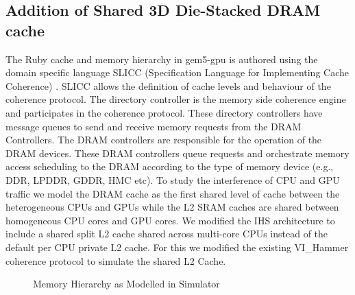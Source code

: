 \subsection{Addition of Shared 3D Die-Stacked DRAM cache}
The Ruby cache and memory hierarchy in gem5-gpu is authored using the domain specific language SLICC (Specification Language for Implementing Cache Coherence) \cite{gems}. SLICC allows the definition of cache levels and behaviour of the coherence protocol. The directory controller is the memory side coherence engine and participates in the coherence protocol. These directory controllers have message queues to send and receive memory requests from the DRAM Controllers. The DRAM controllers are responsible for the operation of the DRAM devices. These DRAM controllers queue requests and orchestrate memory access scheduling to the DRAM according to the type of memory device (e.g., DDR, LPDDR, GDDR, HMC etc). To study the interference of CPU and GPU traffic we model the DRAM cache as the first shared level of cache between the heterogeneous CPUs and GPUs while the L2 SRAM caches are shared between homogeneous CPU cores and GPU cores. We modified the IHS architecture to include a shared split L2 cache shared across multi-core CPUs instead of the default per CPU private L2 cache. For this we modified the existing VI\_Hammer coherence protocol \cite{gem5-gpu} to simulate the shared L2 Cache.
\begin{figure}[!htb]
	\centering
	\def\svgwidth{\columnwidth}
	
	\caption{Memory Hierarchy as Modelled in Simulator}
	\label{fig:simulator-memory}
\end{figure}

